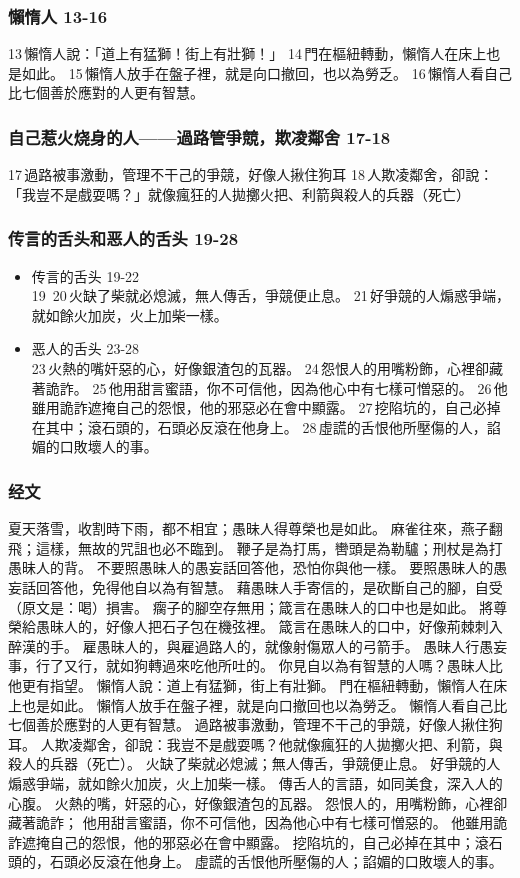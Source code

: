 \subsubsection{懶惰人 13-16}
13 懶惰人說：「道上有猛獅！街上有壯獅！」 
14 門在樞紐轉動，懶惰人在床上也是如此。 
15 懶惰人放手在盤子裡，就是向口撤回，也以為勞乏。 
16 懶惰人看自己比七個善於應對的人更有智慧。



\subsubsection{自己惹火烧身的人——過路管爭競，欺凌鄰舍 17-18}
17 過路被事激動，管理不干己的爭競，好像人揪住狗耳
18 人欺凌鄰舍，卻說：「我豈不是戲耍嗎？」就像瘋狂的人拋擲火把、利箭與殺人的兵器（死亡）


\subsubsection{传言的舌头和恶人的舌头 19-28}
\begin{itemize}
\itemsep-.45em 
\item 传言的舌头 19-22\\
19  20 火缺了柴就必熄滅，無人傳舌，爭競便止息。 
21 好爭競的人煽惑爭端，就如餘火加炭，火上加柴一樣。
\item 恶人的舌头 23-28\\
23 火熱的嘴奸惡的心，好像銀渣包的瓦器。 
24 怨恨人的用嘴粉飾，心裡卻藏著詭詐。 
25 他用甜言蜜語，你不可信他，因為他心中有七樣可憎惡的。
26 他雖用詭詐遮掩自己的怨恨，他的邪惡必在會中顯露。 
27 挖陷坑的，自己必掉在其中；滾石頭的，石頭必反滾在他身上。 
28 虛謊的舌恨他所壓傷的人，諂媚的口敗壞人的事。
\end{itemize}


\subsubsection{经文}
夏天落雪，收割時下雨，都不相宜；愚昧人得尊榮也是如此。
麻雀往來，燕子翻飛；這樣，無故的咒詛也必不臨到。
鞭子是為打馬，轡頭是為勒驢；刑杖是為打愚昧人的背。
不要照愚昧人的愚妄話回答他，恐怕你與他一樣。
要照愚昧人的愚妄話回答他，免得他自以為有智慧。
藉愚昧人手寄信的，是砍斷自己的腳，自受（原文是：喝）損害。
瘸子的腳空存無用；箴言在愚昧人的口中也是如此。
將尊榮給愚昧人的，好像人把石子包在機弦裡。
箴言在愚昧人的口中，好像荊棘刺入醉漢的手。
雇愚昧人的，與雇過路人的，就像射傷眾人的弓箭手。
愚昧人行愚妄事，行了又行，就如狗轉過來吃他所吐的。
你見自以為有智慧的人嗎？愚昧人比他更有指望。
懶惰人說：道上有猛獅，街上有壯獅。
門在樞紐轉動，懶惰人在床上也是如此。
懶惰人放手在盤子裡，就是向口撤回也以為勞乏。
懶惰人看自己比七個善於應對的人更有智慧。
過路被事激動，管理不干己的爭競，好像人揪住狗耳。
人欺凌鄰舍，卻說：我豈不是戲耍嗎？他就像瘋狂的人拋擲火把、利箭，與殺人的兵器（死亡）。
火缺了柴就必熄滅；無人傳舌，爭競便止息。
好爭競的人煽惑爭端，就如餘火加炭，火上加柴一樣。
傳舌人的言語，如同美食，深入人的心腹。
火熱的嘴，奸惡的心，好像銀渣包的瓦器。
怨恨人的，用嘴粉飾，心裡卻藏著詭詐；
他用甜言蜜語，你不可信他，因為他心中有七樣可憎惡的。
他雖用詭詐遮掩自己的怨恨，他的邪惡必在會中顯露。
挖陷坑的，自己必掉在其中；滾石頭的，石頭必反滾在他身上。
虛謊的舌恨他所壓傷的人；諂媚的口敗壞人的事。

